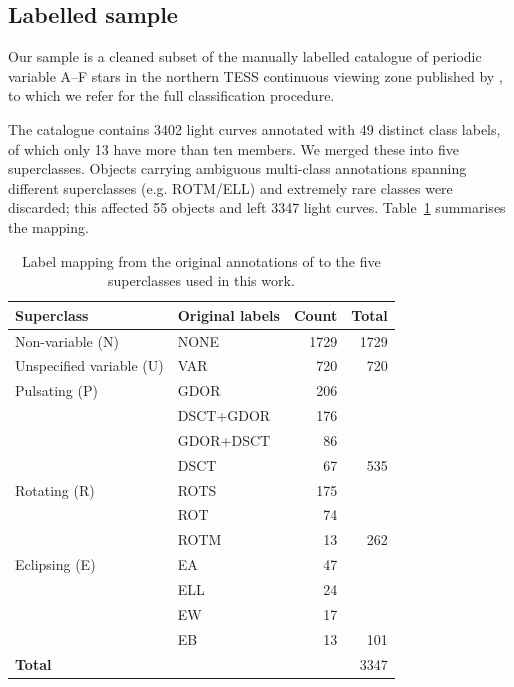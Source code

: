 \documentclass{aa}
\begin{document}
    \subsection{Labelled sample}

    Our sample is a cleaned subset of the manually labelled catalogue of periodic variable
    A--F stars in the northern TESS continuous viewing zone published by
    \citet{Skarka2022}, to which we refer for the full classification procedure.

    The catalogue contains 3402 light curves annotated with 49 distinct class labels, of
    which only 13 have more than ten members. We merged these into five superclasses.
    Objects carrying ambiguous multi-class annotations spanning different superclasses
    (e.g. ROTM/ELL) and extremely rare classes were discarded; this affected 55 objects and
    left \num{3347} light curves. Table~\ref{tab:classes} summarises the mapping.

    \begin{table}[!t]
        \caption{Label mapping from the original annotations of \citet{Skarka2022} to the five
        superclasses used in this work.}
        \label{tab:classes}
        \centering
        \small
        \begin{tabular}{llr r}
            \toprule
            Superclass               & Original labels & Count      & Total      \\
            \midrule
            Non-variable (N)         & NONE            & \num{1729} & \num{1729} \\
            \midrule
            Unspecified variable (U) & VAR             & 720        & 720        \\
            \midrule
            Pulsating (P)            & GDOR            & 206        &            \\
            & DSCT+GDOR       & 176        &            \\
            & GDOR+DSCT       & 86         &            \\
            & DSCT            & 67         & 535        \\
            \midrule
            Rotating (R)             & ROTS            & 175        &            \\
            & ROT             & 74         &            \\
            & ROTM            & 13         & 262        \\
            \midrule
            Eclipsing (E)            & EA              & 47         &            \\
            & ELL             & 24         &            \\
            & EW              & 17         &            \\
            & EB              & 13         & 101        \\
            \midrule
            \textbf{Total}           &                 &            & \num{3347} \\
            \bottomrule
        \end{tabular}
    \end{table}
\end{document}

